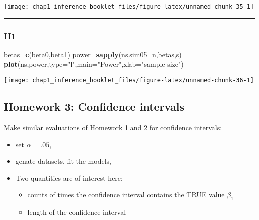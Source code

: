 \documentclass[]{article}
\newenvironment{Shaded}{\begin{snugshade}}{\end{snugshade}}
\newcommand{\KeywordTok}[1]{\textcolor[rgb]{0.13,0.29,0.53}{\textbf{#1}}}
\newcommand{\DataTypeTok}[1]{\textcolor[rgb]{0.13,0.29,0.53}{#1}}
\newcommand{\StringTok}[1]{\textcolor[rgb]{0.31,0.60,0.02}{#1}}
\newcommand{\NormalTok}[1]{#1}
\providecommand{\tightlist}{%
  \setlength{\itemsep}{0pt}\setlength{\parskip}{0pt}}
\begin{document}
\begin{center}\texttt{[image: chap1\_inference\_booklet\_files/figure-latex/unnamed-chunk-35-1]} \end{center}

\begin{center}\rule{0.5\linewidth}{\linethickness}\end{center}

\subsubsection{H1}\label{h1}

\begin{Shaded}
\begin{Highlighting}[]
\NormalTok{betas=}\KeywordTok{c}\NormalTok{(beta0,beta1)}
\NormalTok{power=}\KeywordTok{sapply}\NormalTok{(ns,sim05_n,betas,s)}
\KeywordTok{plot}\NormalTok{(ns,power,}\DataTypeTok{type=}\StringTok{"l"}\NormalTok{,}\DataTypeTok{main=}\StringTok{"Power"}\NormalTok{,}\DataTypeTok{xlab=}\StringTok{"sample size"}\NormalTok{)}
\end{Highlighting}
\end{Shaded}

\begin{center}\texttt{[image: chap1\_inference\_booklet\_files/figure-latex/unnamed-chunk-36-1]} \end{center}

\subsection{Homework 3: Confidence
intervals}\label{homework-3-confidence-intervals}

Make similar evaluations of Homework 1 and 2 for confidence intervals:

\begin{itemize}
\tightlist
\item
  set \(\alpha=.05\),
\item
  genate datasets, fit the models,
\item
  Two quantities are of interest here:

  \begin{itemize}
  \tightlist
  \item
    counts of times the confidence interval contains the TRUE value
    \(\beta_1\)
  \item
    length of the confidence interval
  \end{itemize}
\end{itemize}
\end{document}
